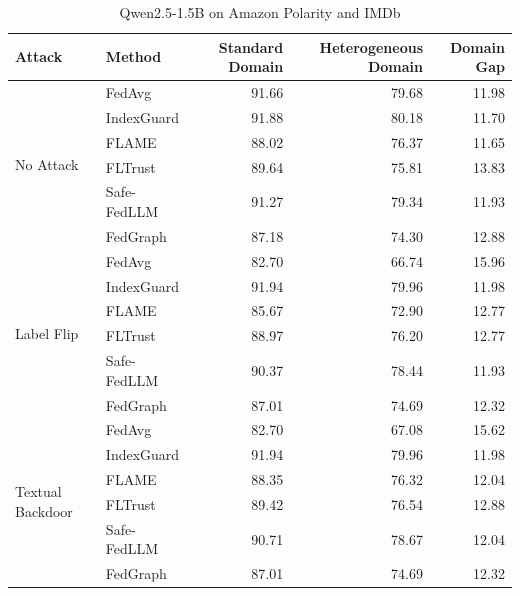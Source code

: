 \documentclass[10pt]{article}
\begin{document}
\begin{table}[htbp]
\centering
\caption{Qwen2.5-1.5B on Amazon Polarity and IMDb}
\label{tab:qwen15_amazon_imdb}
\small
\begin{tabular}{llrrr}
\toprule
Attack & Method & Standard Domain & Heterogeneous Domain & Domain Gap \\
\midrule
\multirow{6}{*}{No Attack} & FedAvg & 91.66 & 79.68 & 11.98 \\
 & IndexGuard & 91.88 & 80.18 & 11.70 \\
 & FLAME & 88.02 & 76.37 & 11.65 \\
 & FLTrust & 89.64 & 75.81 & 13.83 \\
 & Safe-FedLLM & 91.27 & 79.34 & 11.93 \\
 & FedGraph & 87.18 & 74.30 & 12.88 \\
\midrule
\multirow{6}{*}{Label Flip} & FedAvg & 82.70 & 66.74 & 15.96 \\
 & IndexGuard & 91.94 & 79.96 & 11.98 \\
 & FLAME & 85.67 & 72.90 & 12.77 \\
 & FLTrust & 88.97 & 76.20 & 12.77 \\
 & Safe-FedLLM & 90.37 & 78.44 & 11.93 \\
 & FedGraph & 87.01 & 74.69 & 12.32 \\
\midrule
\multirow{6}{*}{Textual Backdoor} & FedAvg & 82.70 & 67.08 & 15.62 \\
 & IndexGuard & 91.94 & 79.96 & 11.98 \\
 & FLAME & 88.35 & 76.32 & 12.04 \\
 & FLTrust & 89.42 & 76.54 & 12.88 \\
 & Safe-FedLLM & 90.71 & 78.67 & 12.04 \\
 & FedGraph & 87.01 & 74.69 & 12.32 \\
\bottomrule
\end{tabular}
\end{table}
\clearpage
\end{document}
